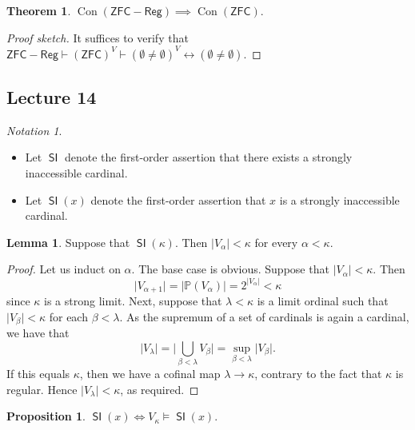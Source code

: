 \documentclass[10pt,letterpaper,cm]{nupset}
\theoremstyle{definition}
\theoremstyle{theorem}
\newtheorem{theorem}[definition]{Theorem}
\newtheorem{lemma}[definition]{Lemma}
\newtheorem{prop}[definition]{Proposition}
\theoremstyle{remark}
\newtheorem*{notation}{Notation}
\renewcommand{\P}{\mathbb P}
\newcommand{\1}{\mathbf{1}}
\newcommand{\0}{\vec 0}
\newcommand{\zfc}{\mathsf{ZFC}}
\DeclareMathOperator{\si}{\mathsf{SI}}
\DeclareMathOperator{\con}{Con}
\newcommand{\bi}{\begin{itemize}}
\newcommand{\ei}{\end{itemize}}
\begin{document}
\begin{theorem}
$\con(\zfc - \mathsf{Reg}) \implies \con(\zfc)$.
\end{theorem}
\begin{proof}[Proof sketch]
It suffices to verify that $\zfc - \mathsf{Reg} \vdash \left(\zfc\right)^V \vdash \left(\emptyset \ne \emptyset \right)^V \leftrightarrow  \left(\emptyset \ne \emptyset\right)$.
\end{proof}

\subsection{Lecture 14}

\begin{notation}$ $
\bi
\item Let $\si$ denote the first-order assertion that there exists a strongly inaccessible cardinal.
\item Let $\si(x)$ denote the first-order assertion that $x$ is a strongly inaccessible cardinal.
\ei
\end{notation}

\begin{lemma}\label{Vcard}
Suppose that $\si(\kappa)$. Then $\lvert{V_{\alpha}}\rvert < \kappa$ for every $\alpha <\kappa$.
\end{lemma}
\begin{proof}
Let us induct on $\alpha$. The base case is obvious. Suppose that $\lvert{V_{\alpha}}\rvert <\kappa$. Then 
\[
\lvert{V_{\alpha +1}}\rvert = \lvert{\P(V_{\alpha})}\rvert = 2^{\lvert{V_{\alpha}}\rvert} <\kappa
\] since $\kappa$ is a strong limit. Next, suppose that $\lambda <\kappa$ is a limit ordinal such that $\lvert{V_{\beta}}\rvert <\kappa$ for each $\beta < \lambda$. As the supremum of a set of cardinals is again a cardinal, we have that
\[
\lvert{V_{\lambda}}\rvert = \lvert{\bigcup_{\beta < \lambda}V_{\beta}}\rvert = \sup_{\beta < \lambda}\lvert{V_{\beta}}\rvert.
\] If this equals $\kappa$, then we have a cofinal map $\lambda \to \kappa$, contrary to the fact that $\kappa$ is regular. Hence $\lvert{V_{\lambda}}\rvert < \kappa$, as required.
\end{proof}

\begin{prop}\label{abssi}
$\si(x) \iff V_{\kappa} \models \si(x)$.
\end{prop}
\end{document}
